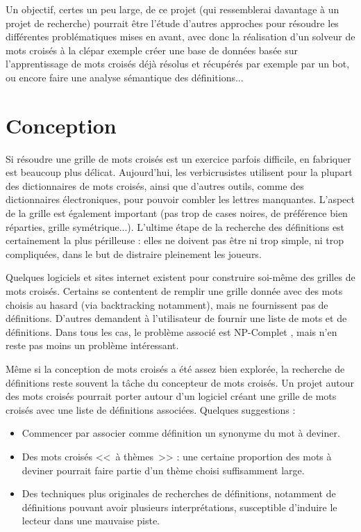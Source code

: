 \documentclass{article}
\begin{document}
Un objectif, certes un peu large, de ce projet (qui ressemblerai davantage à un projet de recherche) pourrait être l'étude d'autres approches pour résoudre les différentes problématiques mises en avant, avec donc la réalisation d'un solveur de mots croisés à la clépar exemple créer une base de données basée sur l'apprentissage de mots croisés déjà résolus et récupérés par exemple par un bot, ou encore faire une analyse sémantique des définitions...

\section{Conception}

Si résoudre une grille de mots croisés est un exercice parfois difficile, en fabriquer est beaucoup plus délicat. Aujourd'hui, les verbicrusistes utilisent pour la plupart des dictionnaires de mots croisés, ainsi que d'autres outils, comme des dictionnaires électroniques, pour pouvoir combler les lettres manquantes. L'aspect de la grille est également important (pas trop de cases noires, de préférence bien réparties, grille symétrique...). L'ultime étape de la recherche des définitions est certainement la plus périlleuse : elles ne doivent pas être ni trop simple, ni trop compliquées, dans le but de distraire pleinement les joueurs.

Quelques logiciels et sites internet existent pour construire soi-même des grilles de mots croisés. Certains se contentent de remplir une grille donnée avec des mots choisis au hasard (via backtracking notamment), mais ne fournissent pas de définitions. D'autres demandent à l'utilisateur de fournir une liste de mots et de définitions. Dans tous les cas, le problème associé est NP-Complet \cite{NP-complete}, mais n'en reste pas moins un problème intéressant.

Même si la conception de mots croisés a été assez bien explorée, la recherche de définitions reste souvent la tâche du concepteur de mots croisés. Un projet autour des mots croisés pourrait porter autour d'un logiciel créant une grille de mots croisés avec une liste de définitions associées. Quelques suggestions :

\begin{itemize}
	\item Commencer par associer comme définition un synonyme du mot à deviner.
	\item Des mots croisés <<~à thèmes~>> : une certaine proportion des mots à deviner pourrait faire partie d'un thème choisi suffisamment large.
	\item Des techniques plus originales de recherches de définitions, notamment de définitions pouvant avoir plusieurs interprétations, susceptible d'induire le lecteur dans une mauvaise piste.
\end{itemize}
\end{document}

